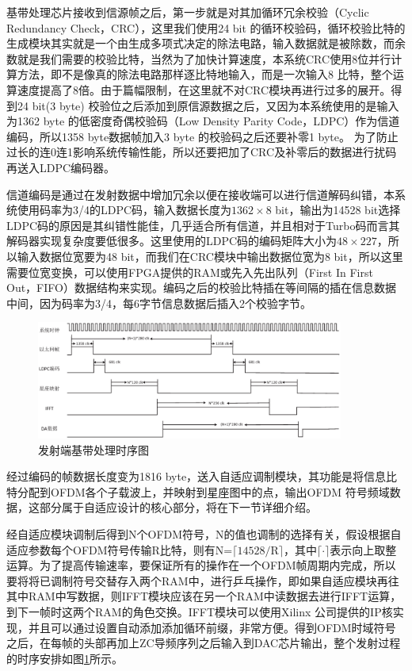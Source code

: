 基带处理芯片接收到信源帧之后，第一步就是对其加循环冗余校验（Cyclic Redundancy Check，CRC），这里我们使用24 bit 的循环校验码，循环校验比特的生成模块其实就是一个由生成多项式决定的除法电路，输入数据就是被除数，而余数就是我们需要的校验比特，当然为了加快计算速度，本系统CRC使用8位并行计算方法，即不是像真的除法电路那样逐比特地输入，而是一次输入8 比特，整个运算速度提高了8倍。由于篇幅限制，在这里就不对CRC模块再进行过多的展开。得到24 bit(3 byte) 校验位之后添加到原信源数据之后，又因为本系统使用的是输入为1362 byte 的低密度奇偶校验码（Low Density Parity Code，LDPC）作为信道编码，所以1358 byte数据帧加入3 byte 的校验码之后还要补零1 byte。 为了防止过长的连0连1影响系统传输性能，所以还要把加了CRC及补零后的数据进行扰码再送入LDPC编码器。

信道编码是通过在发射数据中增加冗余以便在接收端可以进行信道解码纠错，本系统使用码率为3/4的LDPC码，输入数据长度为$1362\times 8$ bit，输出为14528 bit选择LDPC码的原因是其纠错性能佳，几乎适合所有信道，并且相对于Turbo码而言其解码器实现复杂度要低很多。这里使用的LDPC码的编码矩阵大小为$48\times 227$，所以输入数据位宽要为48 bit，而我们在CRC模块中输出数据位宽为8 bit，所以这里需要位宽变换，可以使用FPGA提供的RAM或先入先出队列（First In First Out，FIFO）数据结构来实现。编码之后的校验比特插在等间隔的插在信息数据中间，因为码率为3/4，每6字节信息数据后插入2个校验字节。

\begin{figure}[htbp]
\centering
\includegraphics[width=0.9\textwidth]{figures/chapter-5/TimeSchemeTrans.eps}
\caption{发射端基带处理时序图}
\label{fig:TimeSchemeTrans}
\end{figure}
经过编码的帧数据长度变为1816 byte，送入自适应调制模块，其功能是将信息比特分配到OFDM各个子载波上，并映射到星座图中的点，输出OFDM 符号频域数据，这部分属于自适应设计的核心部分，将在下一节详细介绍。

经自适应模块调制后得到N个OFDM符号，N的值也调制的选择有关，假设根据自适应参数每个OFDM符号传输R比特，则有N=$\lceil 14528/\text{R} \rceil$，其中$\lceil \cdot \rceil$表示向上取整运算。为了提高传输速率，要保证所有的操作在一个OFDM帧周期内完成，所以要将将已调制符号交替存入两个RAM中，进行乒乓操作，即如果自适应模块再往其中RAM中写数据，则IFFT模块应该在另一个RAM中读数据去进行IFFT运算，到下一帧时这两个RAM的角色交换。IFFT模块可以使用Xilinx 公司提供的IP核实现，并且可以通过设置自动添加添加循环前缀，非常方便。得到OFDM时域符号之后，在每帧的头部再加上ZC导频序列之后输入到DAC芯片输出，整个发射过程的时序安排如图\ref{fig:TimeSchemeTrans}所示。
